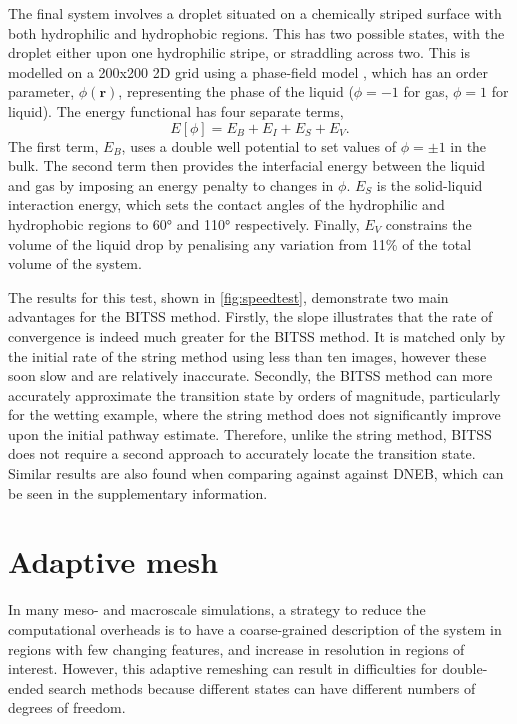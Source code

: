 \documentclass[aps,twocolumn]{revtex4}
\begin{document}
\topic The final system involves a droplet situated on a chemically striped surface with both hydrophilic and hydrophobic regions.
This has two possible states, with the droplet either upon one hydrophilic stripe, or straddling across two.
This is modelled on a 200x200 2D grid using a phase-field model \cite{Panter2019b}, which has an order parameter, $\phi(\bm{r})$, representing the phase of the liquid ($\phi=-1$ for gas, $\phi=1$ for liquid).
The energy functional has four separate terms,
\begin{equation}
  E[\phi] = E_B + E_I + E_S + E_V.
\end{equation}
The first term, $E_B$, uses a double well potential to set values of $\phi=\pm1$ in the bulk.
The second term then provides the interfacial energy between the liquid and gas by imposing an energy penalty to changes in $\phi$.
$E_S$ is the solid-liquid interaction energy, which sets the contact angles of the hydrophilic and hydrophobic regions to 60\si{\degree} and 110\si{\degree} respectively.
Finally, $E_V$ constrains the volume of the liquid drop by penalising any variation from 11\% of the total volume of the system.

\topic The results for this test, shown in \cref{fig:speedtest}, demonstrate two main advantages for the BITSS method.
Firstly, the slope illustrates that the rate of convergence is indeed much greater for the BITSS method.
It is matched only by the initial rate of the string method using less than ten images, however these soon slow and are relatively inaccurate.
Secondly, the BITSS method can more accurately approximate the transition state by orders of magnitude, particularly for the wetting example, where the string method does not significantly improve upon the initial pathway estimate.
Therefore, unlike the string method, BITSS does not require a second approach to accurately locate the transition state.
Similar results are also found when comparing against against DNEB, which can be seen in the supplementary information.


\section{Adaptive mesh}
\topic In many meso- and macroscale simulations, a strategy to reduce the computational overheads is to have a coarse-grained description of the system in regions with few changing features, and increase in resolution in regions of interest.
However, this adaptive remeshing can result in difficulties for double-ended search methods because different states can have different numbers of degrees of freedom.
\end{document}
